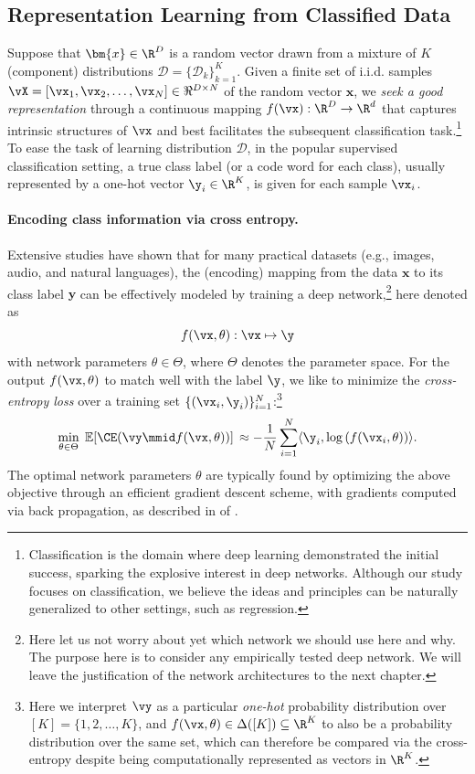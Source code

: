 \documentclass[../../book-main.tex]{subfiles}
\begin{document}
\subsection{Representation Learning from Classified Data}

Suppose that $\bm{x} \in \R^D$ is a random vector drawn from
a mixture of $K$ (component) distributions  $\mathcal{D} =
\{\mathcal{D}_k\}_{k=1}^K$. Given a finite set of i.i.d. samples $\vX =
[\vx_1, \vx_2, \ldots, \vx_N] \in \Re^{D\times N}$ of the random vector
$\bm x$, we {\em seek a good representation}  through a continuous
mapping $f(\vx): \R^D \rightarrow \R^d$ that captures
intrinsic structures of $\vx$ and best facilitates the subsequent
classification task.\footnote{Classification is the domain where deep
    learning demonstrated the initial success, sparking the explosive
    interest in deep networks. Although our study focuses on
    classification, we believe the ideas and principles can be naturally
generalized to other settings, such as regression.} To ease the task
of learning distribution $\mathcal{D}$, in the popular supervised
classification setting, a true class label (or a code word for each
class), usually represented by a one-hot vector $\y_i \in
\R^K$, is given for each sample $\vx_i$.

\paragraph{Encoding class information via cross entropy.}  Extensive
studies have shown that for many practical datasets (e.g., images,
audio, and natural languages), the (encoding) mapping from the data
$\bm{x}$ to its class label $\bm{y}$ can be effectively modeled by
training a deep network,\footnote{Here let us not worry about yet
    which network we should use here and why. The purpose here is to
    consider any empirically tested deep network. We will leave the
justification of the network architectures to the next chapter.} here
denoted as $$f(\vx, \theta):\vx \mapsto \y$$ with network parameters
$\theta \in \Theta$, where $\Theta$ denotes the parameter space. For
the output $f(\vx, \theta)$ to match well with the label $\y$, we like
to  minimize the {\em cross-entropy loss} over a training set
$\{(\vx_i, \y_i)\}_{i=1}^N$:\footnote{Here we interpret \(\vy\) as a
    particular \textit{one-hot} probability distribution over \([K] =
    \{1, 2, \dots, K\}\),
    and \(f(\vx, \theta) \in \Delta([K]) \subseteq \R^{K}\) to also be a
    probability distribution over the same set, which can therefore be
    compared via the cross-entropy despite being computationally
represented as vectors in \(\R^{K}\).}
\begin{equation}
    \min_{\theta \in \Theta} \; \mathbb{E}[\CE(\vy \mmid f(\vx,
    \theta))] \, \approx - \frac{1}{N}\sum_{i=1}^N \langle
    \y_i, \log\left(f(\vx_i, \theta)\right) \rangle.
    \label{chap4-eqn:cross-entropy}
\end{equation}
The optimal network parameters $\theta$ are typically found by
optimizing the above objective through an efficient gradient descent
scheme, with gradients computed via back propagation, as
described in  of .
\end{document}
